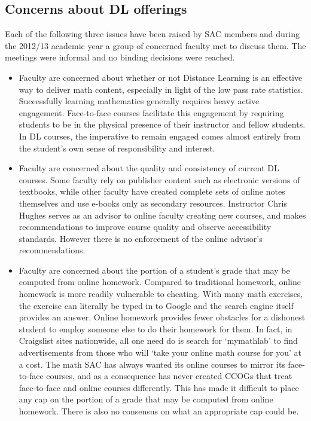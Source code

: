 \subsection{Concerns about DL offerings}
Each of the following three issues have been raised by SAC members and during the 2012/13 academic year a group of concerned faculty met to discuss them. The meetings were informal and no binding decisions were reached.
\begin{itemize}
\item Faculty are concerned about whether or not Distance Learning is an effective way to deliver math content, especially in light of the low pass rate statistics. Successfully learning mathematics generally requires heavy active engagement. Face-to-face courses facilitate this engagement by requiring students to be in the physical presence of their instructor and fellow students. In DL courses, the imperative to remain engaged comes almost entirely from the student's own sense of responsibility and interest.
\item Faculty are concerned about the quality and consistency of current DL courses. Some faculty rely on publisher content such as electronic versions of textbooks, while other faculty have created complete sets of online notes themselves and use e-books only as secondary resources. Instructor Chris Hughes serves as an advisor to online faculty creating new courses, and makes recommendations to improve course quality and observe accessibility standards. However there is no enforcement of the online advisor's recommendations.
\item Faculty are concerned about the portion of a student's grade that may be computed from online homework. Compared to traditional homework, online homework is more readily vulnerable to cheating. With many math exercises, the exercise can literally be typed in to Google and the search engine itself provides an answer. Online homework provides fewer obstacles for a dishonest student to employ someone else to do their homework for them. In fact, in Craigslist sites nationwide, all one need do is search for `mymathlab' to find advertisements from those who will `take your online math course for you' at a cost. The math SAC has always wanted its online courses to mirror its face-to-face courses, and as a consequence has never created CCOGs that treat face-to-face and online courses differently. This has made it difficult to place any cap on the portion of a grade that may be computed from online homework. There is also no consensus on what an appropriate cap could be.
\end{itemize}

